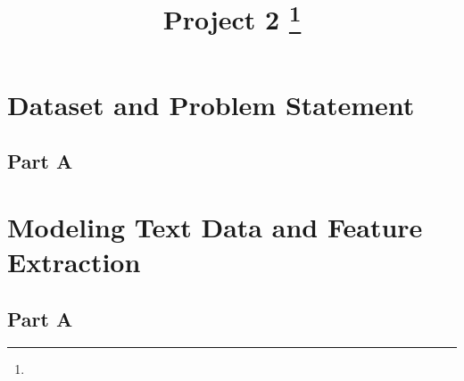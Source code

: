 \documentclass[11pt]{article}
\title{Project 2
\footnote{\s{EE 239AS ; Winter 2016 }
}
}
\begin{document}
\maketitle


\section{Dataset and Problem Statement}
\subsection{Part A}

\section{Modeling Text Data and Feature Extraction}
\subsection{Part A}
\end{document}
